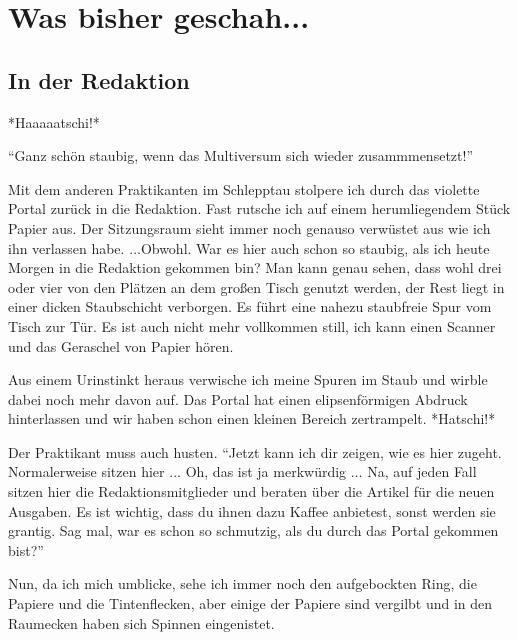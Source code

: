 \documentclass[final]{multiversum}
\begin{document}
\makemultititle
%

\section{Was bisher geschah...}


\subsection{In der Redaktion}
*Haaaaatschi!*

\enquote{Ganz schön staubig, wenn das Multiversum sich wieder zusammmensetzt!}

Mit dem anderen Praktikanten im Schlepptau stolpere ich durch das violette Portal zurück in die Redaktion.
Fast rutsche ich auf einem herumliegendem Stück Papier aus.
Der Sitzungsraum sieht immer noch genauso verwüstet aus wie ich ihn verlassen habe.
$\dots$Obwohl.
War es hier auch schon so staubig, als ich heute Morgen in die Redaktion gekommen bin? 
Man kann genau sehen, dass wohl drei oder vier von den Plätzen an dem großen Tisch genutzt werden, der Rest liegt in einer dicken Staubschicht verborgen.
Es führt eine nahezu staubfreie Spur vom Tisch zur Tür.
Es ist auch nicht mehr vollkommen still, ich kann einen Scanner und das Geraschel von Papier hören.

Aus einem Urinstinkt heraus verwische ich meine Spuren im Staub und wirble dabei noch mehr davon auf. 
Das Portal hat einen elipsenförmigen Abdruck hinterlassen und wir haben schon einen kleinen Bereich zertrampelt.
*Hatschi!*

Der Praktikant muss auch husten.
\enquote{Jetzt kann ich dir zeigen, wie es hier zugeht.
Normalerweise sitzen hier $\dots$ 
Oh, das ist ja merkwürdig $\dots$ 
Na, auf jeden Fall sitzen hier die Redaktionsmitglieder und beraten über die Artikel für die neuen Ausgaben.
Es ist wichtig, dass du ihnen dazu Kaffee anbietest, sonst werden sie grantig.
Sag mal, war es schon so schmutzig, als du durch das Portal gekommen bist?}

Nun, da ich mich umblicke, sehe ich immer noch den aufgebockten Ring, die Papiere und die Tintenflecken, aber einige der Papiere sind vergilbt und in den Raumecken haben sich Spinnen eingenistet.
\end{document}
